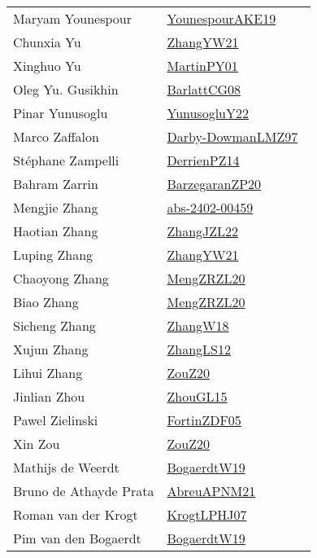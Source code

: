{\begin{longtable}{p{4cm}p{20cm}}
Maryam Younespour & \href{}{YounespourAKE19}~\cite{YounespourAKE19}\\
Chunxia Yu & \href{works/ZhangYW21.pdf}{ZhangYW21}~\cite{ZhangYW21}\\
Xinghuo Yu & \href{works/MartinPY01.pdf}{MartinPY01}~\cite{MartinPY01}\\
Oleg Yu. Gusikhin & \href{works/BarlattCG08.pdf}{BarlattCG08}~\cite{BarlattCG08}\\
Pinar Yunusoglu & \href{}{YunusogluY22}~\cite{YunusogluY22}\\
Marco Zaffalon & \href{works/Darby-DowmanLMZ97.pdf}{Darby-DowmanLMZ97}~\cite{Darby-DowmanLMZ97}\\
St{\'{e}}phane Zampelli & \href{works/DerrienPZ14.pdf}{DerrienPZ14}~\cite{DerrienPZ14}\\
Bahram Zarrin & \href{works/BarzegaranZP20.pdf}{BarzegaranZP20}~\cite{BarzegaranZP20}\\
Mengjie Zhang & \href{works/abs-2402-00459.pdf}{abs-2402-00459}~\cite{abs-2402-00459}\\
Haotian Zhang & \href{works/ZhangJZL22.pdf}{ZhangJZL22}~\cite{ZhangJZL22}\\
Luping Zhang & \href{works/ZhangYW21.pdf}{ZhangYW21}~\cite{ZhangYW21}\\
Chaoyong Zhang & \href{works/MengZRZL20.pdf}{MengZRZL20}~\cite{MengZRZL20}\\
Biao Zhang & \href{works/MengZRZL20.pdf}{MengZRZL20}~\cite{MengZRZL20}\\
Sicheng Zhang & \href{works/ZhangW18.pdf}{ZhangW18}~\cite{ZhangW18}\\
Xujun Zhang & \href{works/ZhangLS12.pdf}{ZhangLS12}~\cite{ZhangLS12}\\
Lihui Zhang & \href{}{ZouZ20}~\cite{ZouZ20}\\
Jinlian Zhou & \href{works/ZhouGL15.pdf}{ZhouGL15}~\cite{ZhouGL15}\\
Pawel Zielinski & \href{works/FortinZDF05.pdf}{FortinZDF05}~\cite{FortinZDF05}\\
Xin Zou & \href{}{ZouZ20}~\cite{ZouZ20}\\
Mathijs de Weerdt & \href{works/BogaerdtW19.pdf}{BogaerdtW19}~\cite{BogaerdtW19}\\
Bruno de Athayde Prata & \href{}{AbreuAPNM21}~\cite{AbreuAPNM21}\\
Roman van der Krogt & \href{works/KrogtLPHJ07.pdf}{KrogtLPHJ07}~\cite{KrogtLPHJ07}\\
Pim van den Bogaerdt & \href{works/BogaerdtW19.pdf}{BogaerdtW19}~\cite{BogaerdtW19}\\

\end{longtable}}
